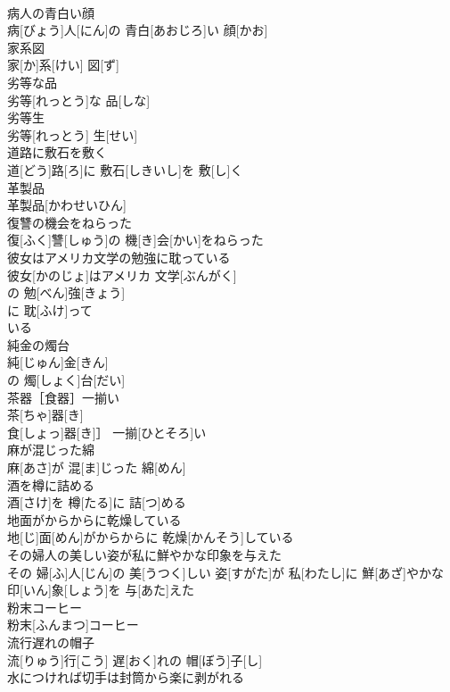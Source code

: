 \documentclass[8pt]{extreport}
\begin{document}
\begin{CJK}{UTF8}{min}
\\	病人の青白い顔	
\\	病[びょう]人[にん]の 青白[あおじろ]い 顔[かお]
\\	家系図	
\\	家[か]系[けい] 図[ず]
\\	劣等な品	
\\	劣等[れっとう]な 品[しな]
\\	劣等生	
\\	劣等[れっとう] 生[せい]
\\	道路に敷石を敷く	
\\	道[どう]路[ろ]に 敷石[しきいし]を 敷[し]く
\\	革製品	
\\	革製品[かわせいひん]
\\	復讐の機会をねらった	
\\	復[ふく]讐[しゅう]の 機[き]会[かい]をねらった
\\	彼女はアメリカ文学の勉強に耽っている	
\\	彼女[かのじょ]はアメリカ 文学[ぶんがく]
\\	の 勉[べん]強[きょう]
\\	に 耽[ふけ]って 
\\	いる
\\	純金の燭台	
\\	純[じゅん]金[きん]
\\	の 燭[しょく]台[だい]
\\	茶器［食器］一揃い	
\\	茶[ちゃ]器[き]
\\	食[しょっ]器[き]］ 一揃[ひとそろ]い
\\	麻が混じった綿	
\\	麻[あさ]が 混[ま]じった 綿[めん]
\\	酒を樽に詰める	
\\	酒[さけ]を 樽[たる]に 詰[つ]める
\\	地面がからからに乾燥している	
\\	地[じ]面[めん]がからからに 乾燥[かんそう]している
\\	その婦人の美しい姿が私に鮮やかな印象を与えた	
\\	その 婦[ふ]人[じん]の 美[うつく]しい 姿[すがた]が 私[わたし]に 鮮[あざ]やかな 印[いん]象[しょう]を 与[あた]えた
\\	粉末コーヒー	
\\	粉末[ふんまつ]コーヒー
\\	流行遅れの帽子	
\\	流[りゅう]行[こう] 遅[おく]れの 帽[ぼう]子[し]
\\	水につければ切手は封筒から楽に剥がれる	

\end{CJK}
\end{document}
